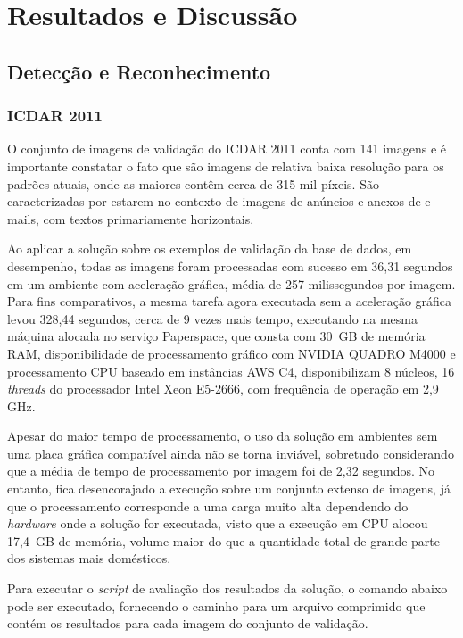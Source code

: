 \chapter{Resultados e Discussão}\label{cap:resultados}

\section{Detecção e Reconhecimento}
\subsection{ICDAR 2011}\label{sec:results_icdar_2011}
O conjunto de imagens de validação do ICDAR 2011 conta com 141 imagens e é importante constatar o fato que são imagens de 
relativa baixa resolução para os padrões atuais, onde as maiores contêm cerca de 315 mil píxeis. São caracterizadas por 
estarem no contexto de imagens de anúncios e anexos de e-mails, com textos primariamente horizontais.

Ao aplicar a solução sobre os exemplos de validação da base de dados, em desempenho, todas as imagens foram processadas com 
sucesso em 36,31 segundos em um ambiente com aceleração gráfica, média de 257 milissegundos por imagem. Para fins comparativos, 
a mesma tarefa agora executada sem a aceleração gráfica levou 328,44 segundos, cerca de 9 vezes mais tempo, executando na 
mesma máquina alocada no serviço Paperspace, que consta com 30 GB de memória RAM, disponibilidade de processamento gráfico 
com NVIDIA QUADRO M4000 e processamento CPU baseado em instâncias AWS C4, disponibilizam 8 núcleos, 16 \textit{threads} do 
processador Intel Xeon E5-2666, com frequência de operação em 2,9 GHz.

Apesar do maior tempo de processamento, o uso da solução em ambientes sem uma placa gráfica compatível ainda não se torna 
inviável, sobretudo considerando que a média de tempo de processamento por imagem foi de 2,32 segundos. No entanto, fica 
desencorajado a execução sobre um conjunto extenso de imagens, já que o processamento corresponde a uma carga muito 
alta dependendo do \textit{hardware} onde a solução for executada, visto que a execução em CPU alocou 17,4 GB de memória, 
volume maior do que a quantidade total de grande parte dos sistemas mais domésticos.

Para executar o \textit{script} de avaliação dos resultados da solução, o comando abaixo pode ser executado, fornecendo o 
caminho para um arquivo comprimido que contém os resultados para cada imagem do conjunto de validação.

